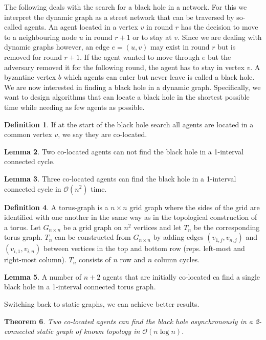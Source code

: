 \documentclass[a4paper, 12pt]{article}
\theoremstyle{plain}
\newtheorem{theorem}{Theorem}[section] %
\theoremstyle{definition}
\newtheorem{definition}[theorem]{Definition} %
\theoremstyle{lemma}
\newtheorem{lemma}[theorem]{Lemma}
\theoremstyle{remark}
\theoremstyle{corollary}
\theoremstyle{example}
\begin{document}
	The following deals with the search for a black hole in a network. For this we interpret the dynamic graph as a street network that can be traversed by so-called agents. An agent located in a vertex $v$ in round $r$ has the decision to move to a neighbouring node $u$ in round $r+1$ or to stay at $v$. Since we are dealing with dynamic graphs however, an edge $e=(u,v)$ may exist in round $r$ but is removed for round $r+1$. If the agent wanted to move through $e$ but the adversary removed it for the following round, the agent has to stay in vertex $v$. A byzantine vertex $b$ which agents can enter but never leave is called a black hole. We are now interested in finding a black hole in a dynamic graph. Specifically, we want to design algorithms that can locate a black hole in the shortest possible time while needing as few agents as possible.
	\begin{definition}
		If at the start of the black hole search all agents are located in a common vertex $v$, we say they are co-located.
	\end{definition}
	\begin{lemma}
		Two co-located agents can not find the black hole in a 1-interval connected cycle.
	\end{lemma}
	\begin{lemma}
		Three co-located agents can find the black hole in a 1-interval connected cycle in $\mathcal{O}(n^2)$ time.
	\end{lemma}
	\begin{definition}
		A torus-graph is a $n\times n$ grid graph where the sides of the grid are identified with one another in the same way as in the topological construction of a torus. Let $G_{n\times n}$ be a grid graph on $n^2$ vertices and let $T_n$ be the corresponding torus graph. $T_n$ can be constructed from $G_{n \times n}$ by adding edges $(v_{1,j}, v_{n,j})$ and $(v_{i,1}, v_{i,n})$ between vertices in the top and bottom row (reps. left-most and right-most column). $T_n$ consists of $n$ row and $n$ column cycles.
	\end{definition}
	\begin{lemma}
		A number of $n+2$ agents that are initially co-located ca find a single black hole in a 1-interval connected torus graph.
	\end{lemma}
	Switching back to static graphs, we can achieve better results.
	\begin{theorem}
		Two co-located agents can find the black hole asynchronously in a 2-connected static graph of known topology in $\mathcal{O}(n\log n)$. 
	\end{theorem}
\end{document}
